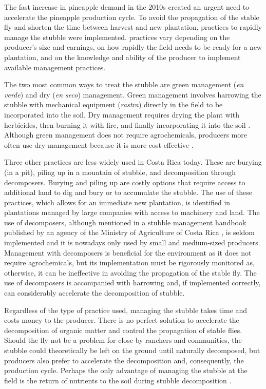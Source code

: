 The fast increase in pineapple demand in the 2010s created an urgent need to accelerate the pineapple production cycle. To avoid the propagation of the stable fly and shorten the time between harvest and new plantation, practices to rapidly manage the stubble were implemented. practices vary depending on the producer's size and earnings, on how rapidly the field needs to be ready for a new plantation, and on the knowledge and ability of the producer to implement available management practices.

The two most common ways to treat the stubble are green management (\textit{en verde}) and dry (\textit{en seco}) management. Green management involves harrowing the stubble with mechanical equipment (\textit{rastra}) directly in the field to be incorporated into the soil. Dry management requires drying the plant with herbicides, then burning it with fire, and finally incorporating it into the soil \citep{pineChaverri2022}. Although green management does not require agrochemicals, producers more often use dry management because it is more cost-effective \citep{hernandez2018impacto}. 

Three other practices are less widely used in Costa Rica today. These are burying (in a pit), piling up in a mountain of stubble, and decomposition through decomposers. Burying and piling up are costly options that require access to additional land to dig and bury or to accumulate the stubble. The use of these practices, which allows for an immediate new plantation, is identified in plantations managed by large companies with access to machinery and land. The use of decomposers, although mentioned in a stubble management handbook published by an agency of the Ministry of Agriculture of Costa Rica \citep{gonzalezMAG2012}, is seldom implemented and it is nowadays only used by small and medium-sized producers. Management with decomposers is beneficial for the environment as it does not require agrochemicals, but its implementation must be rigorously monitored as, otherwise, it can be ineffective in avoiding the propagation of the stable fly. The use of decomposers is accompanied with harrowing and, if implemented correctly, can considerably accelerate the decomposition of stubble. 

Regardless of the type of practice used, managing the stubble takes time and costs money to the producer. There is no perfect solution to accelerate the decomposition of organic matter and control the propagation of stable flies. Should the fly not be a problem for close-by ranchers and communities, the stubble could theoretically be left on the ground until naturally decomposed, but producers also prefer to accelerate the decomposition and, consequently, the production cycle. Perhaps the only advantage of managing the stubble at the field is the return of nutrients to the soil during stubble decomposition \citep{liu2013effects}.

